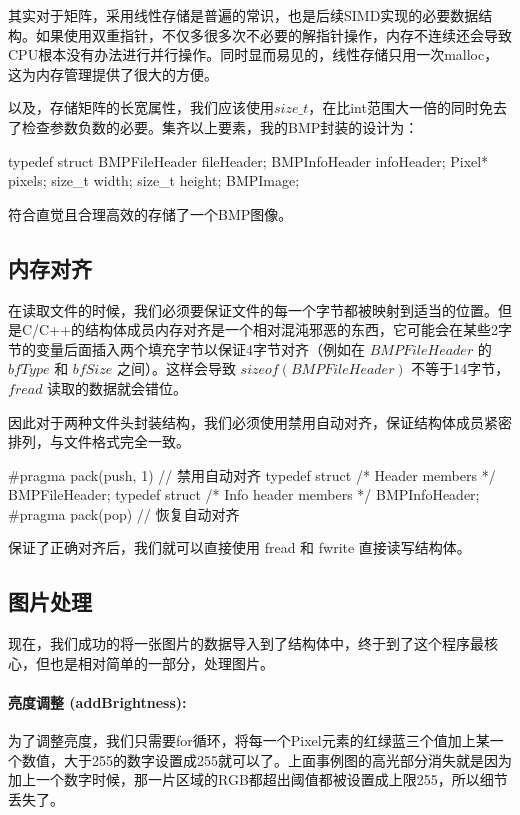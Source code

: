 \documentclass[11pt]{article}
\begin{document}
其实对于矩阵，采用线性存储是普遍的常识，也是后续SIMD实现的必要数据结构。如果使用双重指针，不仅多很多次不必要的解指针操作，内存不连续还会导致CPU根本没有办法进行并行操作。同时显而易见的，线性存储只用一次malloc，这为内存管理提供了很大的方便。


以及，存储矩阵的长宽属性，我们应该使用$size\_t$，在比int范围大一倍的同时免去了检查参数负数的必要。集齐以上要素，我的BMP封装的设计为：
\begin{codeline}
typedef struct {
     BMPFileHeader fileHeader;
     BMPInfoHeader infoHeader;
     Pixel* pixels; 
     size_t width;
     size_t height;
} BMPImage;
\end{codeline}
符合直觉且合理高效的存储了一个BMP图像。

\subsection{内存对齐}
在读取文件的时候，我们必须要保证文件的每一个字节都被映射到适当的位置。但是C/C++的结构体成员内存对齐是一个相对混沌邪恶的东西，它可能会在某些2字节的变量后面插入两个填充字节以保证4字节对齐（例如在 $BMPFileHeader$ 的 $bfType$ 和 $bfSize$ 之间）。这样会导致 $sizeof(BMPFileHeader)$ 不等于14字节，$fread$ 读取的数据就会错位。


因此对于两种文件头封装结构，我们必须使用禁用自动对齐，保证结构体成员紧密排列，与文件格式完全一致。
\begin{codeline}
#pragma pack(push, 1) // 禁用自动对齐
 typedef struct { /* Header members */ } BMPFileHeader;
 typedef struct { /* Info header members */ } BMPInfoHeader;
#pragma pack(pop)   // 恢复自动对齐
\end{codeline}
保证了正确对齐后，我们就可以直接使用 fread 和 fwrite 直接读写结构体。

\subsection{图片处理}
现在，我们成功的将一张图片的数据导入到了结构体中，终于到了这个程序最核心，但也是相对简单的一部分，处理图片。

\paragraph{亮度调整 (addBrightness):}
为了调整亮度，我们只需要for循环，将每一个Pixel元素的红绿蓝三个值加上某一个数值，大于255的数字设置成255就可以了。上面事例图的高光部分消失就是因为加上一个数字时候，那一片区域的RGB都超出阈值都被设置成上限255，所以细节丢失了。
\end{document}
